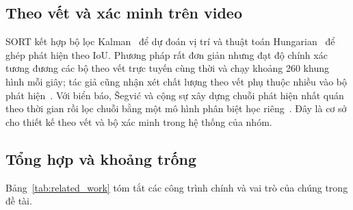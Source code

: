 \subsection{Theo vết và xác minh trên video}
\label{sec:rw_video}

SORT kết hợp bộ lọc Kalman~\cite{kalman1960filter} để dự đoán vị trí và thuật toán Hungarian~\cite{kuhn1955hungarian} để ghép phát hiện theo IoU. Phương pháp rất đơn giản nhưng đạt độ chính xác tương đương các bộ theo vết trực tuyến cùng thời và chạy khoảng 260 khung hình mỗi giây; tác giả cũng nhận xét chất lượng theo vết phụ thuộc nhiều vào bộ phát hiện~\cite{bewley2016sort}. Với biển báo, Šegvić và cộng sự xây dựng chuỗi phát hiện nhất quán theo thời gian rồi lọc chuỗi bằng một mô hình phân biệt học riêng~\cite{segvic2014temporal}. Đây là cơ sở cho thiết kế theo vết và bộ xác minh trong hệ thống của nhóm.

\subsection{Tổng hợp và khoảng trống}
\label{sec:rw_gap}

Bảng~\ref{tab:related_work} tóm tắt các công trình chính và vai trò của chúng trong đề tài.


